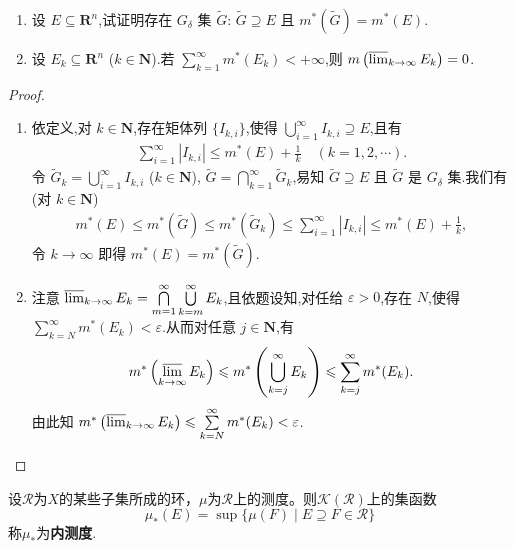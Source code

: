 \documentclass[../../main.tex]{subfiles}%
\begin{document}
\begin{proposition}
\begin{enumerate}[(1)]
\item 设 $E\subseteq\mathbf{R}^n$,试证明存在 $G_\delta$ 集 $\widetilde{G}$: $\widetilde{G}\supseteq E$ 且 $m^*(\widetilde{G})=m^*(E)$.

\item 设 $E_k\subseteq\mathbf{R}^n$ ($k\in\mathbf{N}$).若 $\sum\limits_{k=1}^{\infty}m^*(E_k)<+\infty$,则 $m\left(\varlimsup_{k\to\infty}E_k\right)=0$.
\end{enumerate}
\end{proposition}
\begin{proof}
\begin{enumerate}[(1)]
\item 依定义,对 $k\in\mathbf{N}$,存在矩体列 $\{I_{k,i}\}$,使得 $\bigcup\limits_{i=1}^{\infty}I_{k,i}\supseteq E$,且有
\begin{align*}
\sum\limits_{i=1}^{\infty}|I_{k,i}|\leqslant m^*(E)+\frac{1}{k}\quad (k=1,2,\cdots).
\end{align*}
令 $\widetilde{G}_k=\bigcup\limits_{i=1}^{\infty}I_{k,i}$ ($k\in\mathbf{N}$), $\widetilde{G}=\bigcap\limits_{k=1}^{\infty}\widetilde{G}_k$,易知 $\widetilde{G}\supseteq E$ 且 $\widetilde{G}$ 是 $G_\delta$ 集.我们有(对 $k\in\mathbf{N}$)
\begin{align*}
m^*(E)\leqslant m^*(\widetilde{G})\leqslant m^*(\widetilde{G}_k)\leqslant \sum\limits_{i=1}^{\infty}|I_{k,i}|\leqslant m^*(E)+\frac{1}{k},
\end{align*}
令 $k\to\infty$ 即得 $m^*(E)=m^*(\widetilde{G})$.
\item 注意 $\varlimsup_{k\to\infty}E_k=\bigcap\limits_{m=1}^{\infty}\bigcup\limits_{k=m}^{\infty}E_k$,且依题设知,对任给 $\varepsilon>0$,存在 $N$,使得 $\sum\limits_{k=N}^{\infty}m^*(E_k)<\varepsilon$.从而对任意 $j\in\mathbf{N}$,有
\begin{align*}
m^*\left(\varlimsup_{k\to\infty}E_k\right)\leqslant m^*\left(\bigcup\limits_{k=j}^{\infty}E_k\right)\leqslant \sum\limits_{k=j}^{\infty}m^*(E_k).
\end{align*}
由此知 $m^*\left(\varlimsup_{k\to\infty}E_k\right)\leqslant \sum\limits_{k=N}^{\infty}m^*(E_k)<\varepsilon$.
\end{enumerate}

\end{proof}

\begin{definition}[内测度]
设$\mathscr{R}$为$X$的某些子集所成的环，$\mu$为$\mathscr{R}$上的测度。则$\mathscr{K}(\mathscr{R})$上的集函数
\[
\mu_*(E) = \sup\{\mu(F) \mid E \supseteq F \in \mathscr{R}\}
\]
称$\mu_*$为\textbf{内测度}.
\end{definition}
\end{document}
